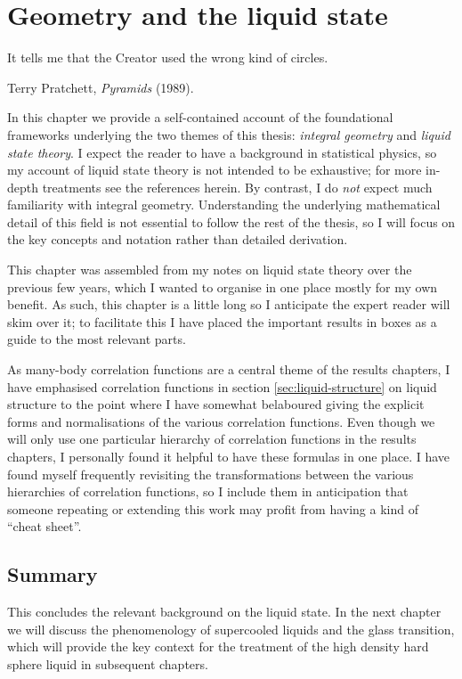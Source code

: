 \documentclass[11pt,twoside]{report}
\def\includebibliography{}
\begin{document}
\chapter{Geometry and the liquid state}
\epigraph{It tells me that the Creator used the wrong kind of circles.}{Terry Pratchett, \emph{Pyramids} (1989).}
\label{chapter:background}

In this chapter we provide a self-contained account of the foundational frameworks underlying the two themes of this thesis: \emph{integral geometry} and \emph{liquid state theory}.
I expect the reader to have a background in statistical physics, so my account of liquid state theory is not intended to be exhaustive; for more in-depth treatments see the references herein.
By contrast, I do \emph{not} expect much familiarity with integral geometry.
Understanding the underlying mathematical detail of this field is not essential to follow the rest of the thesis, so I will focus on the key concepts and notation rather than detailed derivation.

This chapter was assembled from my notes on liquid state theory over the previous few years, which I wanted to organise in one place mostly for my own benefit.
As such, this chapter is a little long so I anticipate the expert reader will skim over it; to facilitate this I have placed the important results in boxes as a guide to the most relevant parts.

As many-body correlation functions are a central theme of the results chapters, I have emphasised correlation functions in section \ref{sec:liquid-structure} on liquid structure to the point where I have somewhat belaboured giving the explicit forms and normalisations of the various correlation functions.
Even though we will only use one particular hierarchy of correlation functions in the results chapters, I personally found it helpful to have these formulas in one place.
I have found myself frequently revisiting the transformations between the various hierarchies of correlation functions, so I include them in anticipation that someone repeating or extending this work may profit from having a kind of ``cheat sheet''.





\section{Summary}

This concludes the relevant background on the liquid state.
In the next chapter we will discuss the phenomenology of supercooled liquids and the glass transition, which will provide the key context for the treatment of the high density hard sphere liquid in subsequent chapters.

\ifdefined\includebibliography
  \printbibliography
\fi
\end{document}
